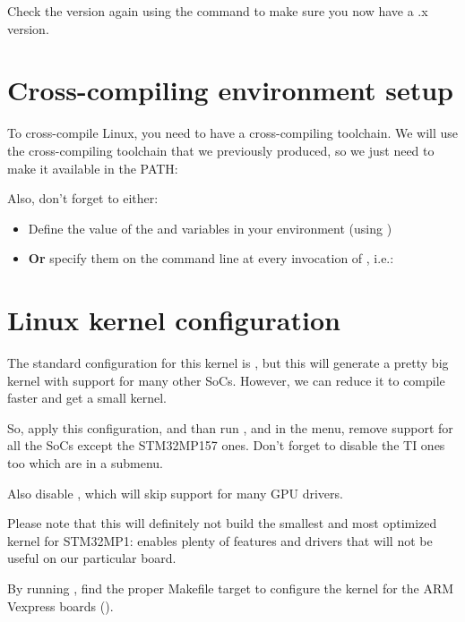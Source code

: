 Check the version again using the  command
to make sure you now have a \workingkernel.x version.

\section{Cross-compiling environment setup}

To cross-compile Linux, you need to have a cross-compiling
toolchain. We will use the cross-compiling toolchain that we
previously produced, so we just need to make it available in the PATH:


Also, don't forget to either:

\begin{itemize}
\item Define the value of the  and 
  variables in your environment (using )
\item {\bf Or} specify them on the command line at every invocation of
  , i.e.: 
\end{itemize}

\section{Linux kernel configuration}

{
The standard configuration for this kernel is ,
but this will generate a pretty big kernel with support for many other
SoCs. However, we can reduce it to compile faster and get a small
kernel.

So, apply this configuration, and than run , and
in the  menu, remove support for all the SoCs except
the STM32MP157 ones. Don't forget to disable the TI ones too which are
in a submenu.

Also disable , which will skip support for many
GPU drivers.

Please note that this will definitely not build the smallest
and most optimized kernel for STM32MP1: 
enables plenty of features and drivers that will not be useful on our
particular board.
}
{
By running , find the proper Makefile target to
configure the kernel
{for the ARM Vexpress boards ().}
}

